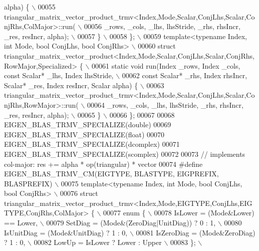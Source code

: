 \begin{DoxyCode}
{       alpha) \{ \(\backslash\)}
00055 \textcolor{preprocessor}{      triangular\_matrix\_vector\_product\_trmv<Index,Mode,Scalar,ConjLhs,Scalar,ConjRhs,ColMajor>::run( \(\backslash\)}
00056 \textcolor{preprocessor}{        \_rows, \_cols, \_lhs, lhsStride, \_rhs, rhsIncr, \_res, resIncr, alpha); \(\backslash\)}
00057 \textcolor{preprocessor}{  \} \(\backslash\)}
00058 \textcolor{preprocessor}{\}; \(\backslash\)}
00059 \textcolor{preprocessor}{template<typename Index, int Mode, bool ConjLhs, bool ConjRhs> \(\backslash\)}
00060 \textcolor{preprocessor}{struct triangular\_matrix\_vector\_product<Index,Mode,Scalar,ConjLhs,Scalar,ConjRhs,RowMajor,Specialized> \{ \(\backslash\)}
00061 \textcolor{preprocessor}{ static void run(Index \_rows, Index \_cols, const Scalar* \_lhs, Index lhsStride, \(\backslash\)}
00062 \textcolor{preprocessor}{                                     const Scalar* \_rhs, Index rhsIncr, Scalar* \_res, Index resIncr, Scalar
       alpha) \{ \(\backslash\)}
00063 \textcolor{preprocessor}{      triangular\_matrix\_vector\_product\_trmv<Index,Mode,Scalar,ConjLhs,Scalar,ConjRhs,RowMajor>::run( \(\backslash\)}
00064 \textcolor{preprocessor}{        \_rows, \_cols, \_lhs, lhsStride, \_rhs, rhsIncr, \_res, resIncr, alpha); \(\backslash\)}
00065 \textcolor{preprocessor}{  \} \(\backslash\)}
00066 \textcolor{preprocessor}{\};}
00067 
00068 EIGEN\_BLAS\_TRMV\_SPECIALIZE(\textcolor{keywordtype}{double})
00069 EIGEN\_BLAS\_TRMV\_SPECIALIZE(\textcolor{keywordtype}{float})
00070 EIGEN\_BLAS\_TRMV\_SPECIALIZE(dcomplex)
00071 EIGEN\_BLAS\_TRMV\_SPECIALIZE(scomplex)
00072 
00073 \textcolor{comment}{// implements col-major: res += alpha * op(triangular) * vector}
00074 \textcolor{preprocessor}{#define EIGEN\_BLAS\_TRMV\_CM(EIGTYPE, BLASTYPE, EIGPREFIX, BLASPREFIX) \(\backslash\)}
00075 \textcolor{preprocessor}{template<typename Index, int Mode, bool ConjLhs, bool ConjRhs> \(\backslash\)}
00076 \textcolor{preprocessor}{struct triangular\_matrix\_vector\_product\_trmv<Index,Mode,EIGTYPE,ConjLhs,EIGTYPE,ConjRhs,ColMajor> \{ \(\backslash\)}
00077 \textcolor{preprocessor}{  enum \{ \(\backslash\)}
00078 \textcolor{preprocessor}{    IsLower = (Mode&Lower) == Lower, \(\backslash\)}
00079 \textcolor{preprocessor}{    SetDiag = (Mode&(ZeroDiag|UnitDiag)) ? 0 : 1, \(\backslash\)}
00080 \textcolor{preprocessor}{    IsUnitDiag  = (Mode&UnitDiag) ? 1 : 0, \(\backslash\)}
00081 \textcolor{preprocessor}{    IsZeroDiag  = (Mode&ZeroDiag) ? 1 : 0, \(\backslash\)}
00082 \textcolor{preprocessor}{    LowUp = IsLower ? Lower : Upper \(\backslash\)}
00083 \textcolor{preprocessor}{  \}; \(\backslash\)}

\end{DoxyCode}
